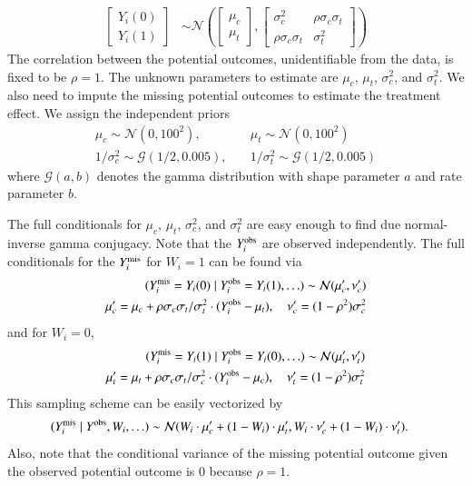\begin{enumerate}[(a)]
  \begin{align*}
    \begin{bmatrix}
      Y_i(0) \\ Y_i(1)
    \end{bmatrix} &\sim \mathcal{N} 
                    \left(
                    \begin{bmatrix}
                      \mu_c \\ \mu_t
                    \end{bmatrix},
    \begin{bmatrix}
      \sigma_c^2 & \rho \sigma_c \sigma_t \\
      \rho \sigma_c \sigma_t & \sigma_t^2
    \end{bmatrix}
                               \right)
  \end{align*}
  The correlation between the potential outcomes, unidentifiable from
  the data, is fixed to be $\rho = 1$.  The unknown parameters to
  estimate are $\mu_c$, $\mu_t$, $\sigma^2_c$, and $\sigma^2_t$.  We also
  need to impute the missing potential outcomes to estimate the
  treatment effect.  We assign the independent priors
  \begin{align*}
    \mu_c \sim \mathcal{N}(0, 100^2),
    &\quad \mu_t \sim \mathcal{N}(0, 100^2) \\
    1/\sigma^2_c \sim \mathcal{G}(1/2, 0.005),
    &\quad 1/\sigma^2_t \sim \mathcal{G}(1/2, 0.005)
  \end{align*}
  where $\mathcal{G}(a,b)$ denotes the gamma distribution with shape
  parameter $a$ and rate parameter $b$.

  The full conditionals for $\mu_c$, $\mu_t$, $\sigma^2_c$, and
  $\sigma^2_t$ are easy enough to find due normal-inverse gamma
  conjugacy.  Note that the $Y_i^{\text{obs}}$ are observed independently.
  The full conditionals for the $Y_i^{\text{mis}}$ for $W_i = 1$ can be found
  via
  \begin{align*}
    (Y_i^{\text{mis}} = Y_i(0) \mid Y_i^{\text{obs}} = Y_i(1), \ldots)
    \sim \mathcal{N}(\mu_c', \nu_c') \\
      \mu_c' = \mu_c + \rho \sigma_c \sigma_t  / \sigma_t^2 \cdot
               (Y_i^{\text{obs}} - \mu_t), \quad
    \nu_c'  = (1 - \rho^2) \sigma^2_c
  \end{align*}
and for $W_i = 0$, 
\begin{align*}
  (Y_i^{\text{mis}} = Y_i(1) \mid Y_i^{\text{obs}} = Y_i(0), \ldots)
  \sim \mathcal{N}(\mu_t', \nu_t') \\
  \mu_t' = \mu_t + \rho \sigma_c \sigma_t  / \sigma_c^2 \cdot
           (Y_i^{\text{obs}} - \mu_c), \quad
  \nu_t' = (1 - \rho^2) \sigma^2_t
\end{align*}
  This sampling scheme can be easily vectorized by
  \begin{align*}
    (Y^{\text{mis}}_i \mid Y^{\text{obs}}, W_i, \ldots)
    &\sim \mathcal{N}(W_i \cdot \mu_c' + (1 - W_i) \cdot \mu_t',
      W_i \cdot \nu_c' + (1 - W_i) \cdot \nu_t' ).
  \end{align*}
  Also, note that the conditional variance of the missing potential
  outcome given the observed potential outcome is 0 because $\rho=1$.


\end{enumerate}
